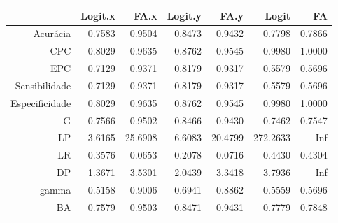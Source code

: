 \begin{table}[ht]
\centering
\begin{tabular}{rrrrrrr}
  \hline
 & Logit.x & FA.x & Logit.y & FA.y & Logit & FA \\ 
  \hline
Acurácia & 0.7583 & 0.9504 & 0.8473 & 0.9432 & 0.7798 & 0.7866 \\ 
  CPC & 0.8029 & 0.9635 & 0.8762 & 0.9545 & 0.9980 & 1.0000 \\ 
  EPC & 0.7129 & 0.9371 & 0.8179 & 0.9317 & 0.5579 & 0.5696 \\ 
  Sensibilidade & 0.7129 & 0.9371 & 0.8179 & 0.9317 & 0.5579 & 0.5696 \\ 
  Especificidade & 0.8029 & 0.9635 & 0.8762 & 0.9545 & 0.9980 & 1.0000 \\ 
  G & 0.7566 & 0.9502 & 0.8466 & 0.9430 & 0.7462 & 0.7547 \\ 
  LP & 3.6165 & 25.6908 & 6.6083 & 20.4799 & 272.2633 &   Inf \\ 
  LR & 0.3576 & 0.0653 & 0.2078 & 0.0716 & 0.4430 & 0.4304 \\ 
  DP & 1.3671 & 3.5301 & 2.0439 & 3.3418 & 3.7936 &   Inf \\ 
  gamma & 0.5158 & 0.9006 & 0.6941 & 0.8862 & 0.5559 & 0.5696 \\ 
  BA & 0.7579 & 0.9503 & 0.8471 & 0.9431 & 0.7779 & 0.7848 \\ 
   \hline
\end{tabular}
\end{table}
